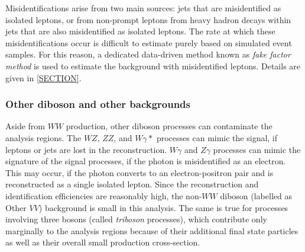 Misidentifications arise from two main sources: jets that are misidentified as isolated leptons, or from non-prompt leptons from heavy hadron decays within jets that are also misidentified as isolated leptons.
The rate at which these misidentifications occur is difficult to estimate purely based on simulated event samples. For this reason, a dedicated data-driven method known as \emph{fake factor method} is used to estimate the background with misidentified leptons. Details are given in \cref{SECTION}.


\subsubsection{Other diboson and other backgrounds}
Aside from $WW$ production, other diboson processes can contaminate the analysis regions. 
The $WZ$, $ZZ$, and $W\gamma*$ processes can mimic the signal, if leptons or jets are lost in the reconstruction. 
$W\gamma$ and $Z\gamma$ processes can mimic the signature of the signal processes, if the photon is misidentified as an electron. This may occur, if the photon converts to an electron-positron pair and is reconstructed as a single isolated lepton. 
Since the reconstruction and identification efficiencies are reasonably high, the non-$WW$ diboson (labelled as Other $VV$) background is small in this analysis.
The same is true for processes involving three bosons (called \emph{triboson} processes), which contribute only marginally to the analysis regions because of their additional final state particles as well as their overall small production cross-section. 
